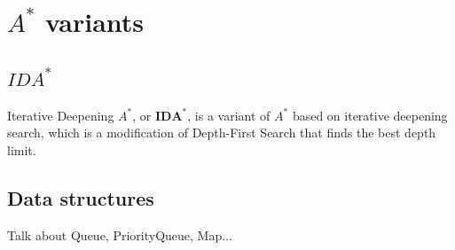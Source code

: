 \documentclass[12pt]{report}
\begin{document}


\chapter{$A^*$ variants}

\section{$IDA^*$}
Iterative Deepening $A^*$, or $\bm{IDA^*}$, is a variant of $A^*$ based on iterative deepening search, which is a modification of Depth-First Search that finds the best depth limit. %




\begin{appendices}

\chapter{Data structures}
Talk about Queue, PriorityQueue, Map...


\end{appendices}
\end{document}
